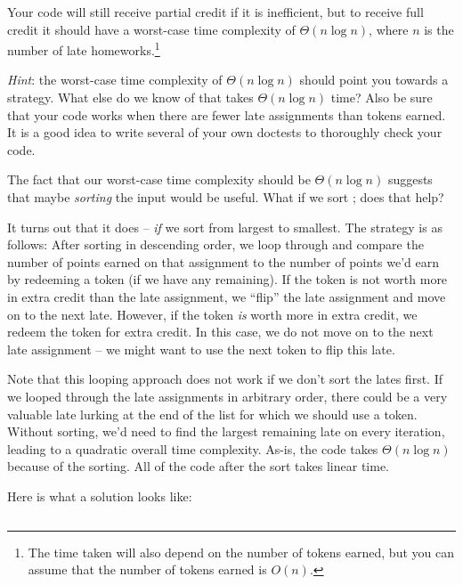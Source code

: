\begin{prob}
    Your code will still receive partial credit if it is inefficient, but to receive full
    credit it should have a worst-case time complexity of $\Theta(n \log n)$,
    where $n$ is the number of late homeworks.\footnote{The time taken will also depend on
    the number of tokens earned, but you can assume that the number of tokens earned is $O(n)$.}

    \emph{Hint}: the worst-case time complexity of $\Theta(n \log n)$ should point you towards
    a strategy. What else do we know of that takes $\Theta(n \log n)$ time? Also be sure that your code works when
    there are fewer late assignments than tokens earned. It is a good idea to write several of your
    own doctests to thoroughly check your code.


    \begin{soln}
        The fact that our worst-case time complexity should be $\Theta(n \log n)$ suggests that maybe
        \emph{sorting} the input would be useful. What if we sort ; does that help?

        It turns out that it does -- \emph{if} we sort from largest to smallest. The strategy
        is as follows: After sorting  in descending order, we loop through and
        compare the number of points earned on that assignment to the number of points we'd
        earn by redeeming a token (if we have any remaining). If the token is not worth
        more in extra credit than the late assignment, we ``flip'' the late assignment and move
        on to the next late. However, if the token \emph{is} worth more in extra credit, we redeem the token for
        extra credit. In this case, we do not move on to the next late assignment -- we might want
        to use the next token to flip this late.

        Note that this looping approach does not work if we don't sort the lates first. If we
        looped through the late assignments in arbitrary order, there could be a very valuable
        late lurking at the end of the list for which we should use a token. Without sorting,
        we'd need to find the largest remaining late on every iteration, leading to a
        quadratic overall time complexity. As-is, the code takes $\Theta(n \log n)$ because
        of the sorting. All of the code after the sort takes linear time.

        Here is what a solution looks like:

        \inputminted{python}{\thisdir/include-solution/allocate_tokens.py}

    \end{soln}

\end{prob}
